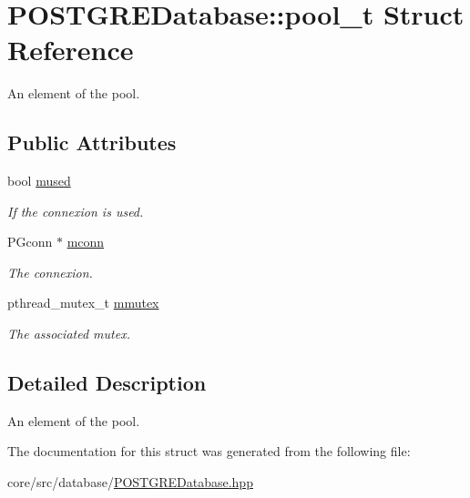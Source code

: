 \hypertarget{structPOSTGREDatabase_1_1pool__t}{
\section{POSTGREDatabase::pool\_\-t Struct Reference}
\label{structPOSTGREDatabase_1_1pool__t}
}


An element of the pool.  


\subsection*{Public Attributes}
\begin{DoxyCompactItemize}
\item 
\hypertarget{structPOSTGREDatabase_1_1pool__t_ac48c9f782f8d28a3942822d1470aad38}{
bool \hyperlink{structPOSTGREDatabase_1_1pool__t_ac48c9f782f8d28a3942822d1470aad38}{mused}}
\label{structPOSTGREDatabase_1_1pool__t_ac48c9f782f8d28a3942822d1470aad38}

\begin{DoxyCompactList}\small\item\em If the connexion is used. \item\end{DoxyCompactList}\item 
\hypertarget{structPOSTGREDatabase_1_1pool__t_ad1b86ef42ea7264db73f2177eb8a5481}{
PGconn $\ast$ \hyperlink{structPOSTGREDatabase_1_1pool__t_ad1b86ef42ea7264db73f2177eb8a5481}{mconn}}
\label{structPOSTGREDatabase_1_1pool__t_ad1b86ef42ea7264db73f2177eb8a5481}

\begin{DoxyCompactList}\small\item\em The connexion. \item\end{DoxyCompactList}\item 
\hypertarget{structPOSTGREDatabase_1_1pool__t_a08aaaa8642ebade26a2ce7889f127c3c}{
pthread\_\-mutex\_\-t \hyperlink{structPOSTGREDatabase_1_1pool__t_a08aaaa8642ebade26a2ce7889f127c3c}{mmutex}}
\label{structPOSTGREDatabase_1_1pool__t_a08aaaa8642ebade26a2ce7889f127c3c}

\begin{DoxyCompactList}\small\item\em The associated mutex. \item\end{DoxyCompactList}\end{DoxyCompactItemize}


\subsection{Detailed Description}
An element of the pool. 

The documentation for this struct was generated from the following file:\begin{DoxyCompactItemize}
\item 
core/src/database/\hyperlink{POSTGREDatabase_8hpp}{POSTGREDatabase.hpp}\end{DoxyCompactItemize}
